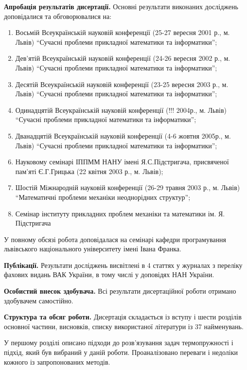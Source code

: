 \textbf{Апробація результатів дисертації.} Основні результати
виконаних досліджень доповідалися та обговорювалися на:

\begin{enumerate}
\def\labelenumi{\arabic{enumi}.}
\item
  Восьмій Всеукраїнській науковій конференції (25-27 вересня 2001 р., м.
  Львів) ``Сучасні проблеми прикладної математики та інформатики'';
\item
  Дев'ятій Всеукраїнській науковій конференції (24-26 вересня 2002 р.,
  м. Львів) ``Сучасні проблеми прикладної математики та інформатики'';
\item
  Десятій Всеукраїнській науковій конференції (23-25 вересня 2003 р., м.
  Львів) ``Сучасні проблеми прикладної математики та інформатики'';
\item
  Одинадцятій Всеукраїнській науковій конференції (!!! 2004р., м. Львів)
  ``Сучасні проблеми прикладної математики та інформатики'';
\item
  Дванадцятій Всеукраїнській науковій конференції (4-6 жовтня 2005р., м.
  Львів) ``Сучасні проблеми прикладної математики та інформатики'';
\item
  Науковому семінарі ІППММ НАНУ імені Я.С.Підстригача, присвяченої
  пам'яті Є.Г.Грицька (22 квітня 2003 р., м. Львів);
\item
  Шостій Міжнародній науковій конференції (26-29 травня 2003 р., м.
  Львів) ``Математичні проблеми механіки неоднорідних структур'';
\item
  Семінар інституту прикладних проблем механіки та математики ім. Я.
  Підстригача
\end{enumerate}

У повному обсязі робота доповідалася на семінарі кафедри програмування
львівського національного університету імені Івана Франка.

\textbf{Публікації.} Результати досліджень висвітлені в 4 статтях
у журналах з переліку фахових видань ВАК України, в тому числі у
доповідях НАН України.

\textbf{Особистий внесок здобувача.} Всі результати дисертаційної
роботи отримано здобувачем самостійно.

\textbf{Структура та обсяг роботи.} Дисертація складається із
вступу і шести розділів основної частини, висновків, списку використаної
літератури із 37 найменувань.

У першому розділі описано підходи до розв'язування задач термопружності
і підхід, який був вибраний у даній роботи. Проаналізовано переваги і
недоліки кожного із запропонованих методів.

